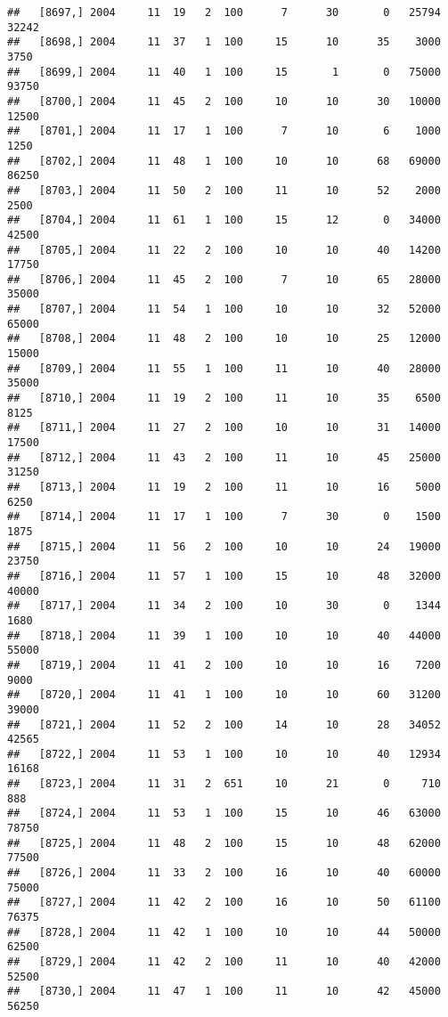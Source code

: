 \documentclass{article}\usepackage[]{graphicx}\usepackage[]{color}
\makeatletter
\newenvironment{kframe}{%
 \def\at@end@of@kframe{}%
 \ifinner\ifhmode%
  \def\at@end@of@kframe{\end{minipage}}%
  \begin{minipage}{\columnwidth}%
 \fi\fi%
 \def\FrameCommand##1{\hskip\@totalleftmargin \hskip-\fboxsep
 \colorbox{shadecolor}{##1}\hskip-\fboxsep
     \hskip-\linewidth \hskip-\@totalleftmargin \hskip\columnwidth}%
 \MakeFramed {\advance\hsize-\width
   \@totalleftmargin\z@ \linewidth\hsize
   \@setminipage}}%
 {\par\unskip\endMakeFramed%
 \at@end@of@kframe}
\newenvironment{knitrout}{}{} %
\makeatother
\begin{document}
\begin{knitrout}
\begin{kframe}
\begin{verbatim}
##   [8697,] 2004     11  19   2  100      7      30       0   25794   32242
##   [8698,] 2004     11  37   1  100     15      10      35    3000    3750
##   [8699,] 2004     11  40   1  100     15       1       0   75000   93750
##   [8700,] 2004     11  45   2  100     10      10      30   10000   12500
##   [8701,] 2004     11  17   1  100      7      10       6    1000    1250
##   [8702,] 2004     11  48   1  100     10      10      68   69000   86250
##   [8703,] 2004     11  50   2  100     11      10      52    2000    2500
##   [8704,] 2004     11  61   1  100     15      12       0   34000   42500
##   [8705,] 2004     11  22   2  100     10      10      40   14200   17750
##   [8706,] 2004     11  45   2  100      7      10      65   28000   35000
##   [8707,] 2004     11  54   1  100     10      10      32   52000   65000
##   [8708,] 2004     11  48   2  100     10      10      25   12000   15000
##   [8709,] 2004     11  55   1  100     11      10      40   28000   35000
##   [8710,] 2004     11  19   2  100     11      10      35    6500    8125
##   [8711,] 2004     11  27   2  100     10      10      31   14000   17500
##   [8712,] 2004     11  43   2  100     11      10      45   25000   31250
##   [8713,] 2004     11  19   2  100     11      10      16    5000    6250
##   [8714,] 2004     11  17   1  100      7      30       0    1500    1875
##   [8715,] 2004     11  56   2  100     10      10      24   19000   23750
##   [8716,] 2004     11  57   1  100     15      10      48   32000   40000
##   [8717,] 2004     11  34   2  100     10      30       0    1344    1680
##   [8718,] 2004     11  39   1  100     10      10      40   44000   55000
##   [8719,] 2004     11  41   2  100     10      10      16    7200    9000
##   [8720,] 2004     11  41   1  100     10      10      60   31200   39000
##   [8721,] 2004     11  52   2  100     14      10      28   34052   42565
##   [8722,] 2004     11  53   1  100     10      10      40   12934   16168
##   [8723,] 2004     11  31   2  651     10      21       0     710     888
##   [8724,] 2004     11  53   1  100     15      10      46   63000   78750
##   [8725,] 2004     11  48   2  100     15      10      48   62000   77500
##   [8726,] 2004     11  33   2  100     16      10      40   60000   75000
##   [8727,] 2004     11  42   2  100     16      10      50   61100   76375
##   [8728,] 2004     11  42   1  100     10      10      44   50000   62500
##   [8729,] 2004     11  42   2  100     11      10      40   42000   52500
##   [8730,] 2004     11  47   1  100     11      10      42   45000   56250

\end{verbatim}
\end{kframe}
\end{knitrout}
\end{document}
